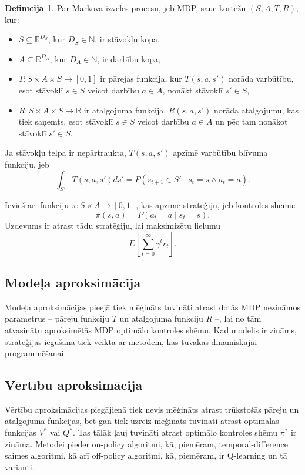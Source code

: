 \documentclass[a0,landscape]{a0poster}
\numberwithin{equation}{section}
\theoremstyle{definition}
\newtheorem{definicija}{Defin\={\i}cija}%
\theoremstyle{plain}
\begin{document}
\begin{multicols}{4}
\begin{definicija}
Par Markova izvēles procesu, jeb MDP, sauc kortežu $(S, A, T, R)$, kur:
\begin{itemize}
	\item $S \subseteq \mathbb{R}^{D_S}$, kur $D_S \in \mathbb{N}$, ir stāvokļu kopa, %
	\item $A \subseteq \mathbb{R}^{D_A}$, kur $D_A \in \mathbb{N}$, ir darbību kopa, %
	\item $T:S \times A \times S \rightarrow [0,1]$ ir pārejas funkcija, kur $T(s, a, s')$ norāda varbūtību, esot stāvoklī $s \in S$ veicot darbību $a \in A$, nonākt stāvoklī $s' \in S$,
	\item $R:S \times A \times S \rightarrow \mathbb{R}$ ir atalgojuma funkcija, $R(s, a, s')$ norāda atalgojumu, kas tiek saņemts, esot stāvoklī $s \in S$ veicot darbību $a \in A$ un pēc tam nonākot stāvoklī $s' \in S$.
\end{itemize}
Ja stāvokļu telpa ir nepārtraukta, $T(s, a, s')$ apzīmē varbūtību blīvuma funkciju, jeb
\[
	\int_{S'} T(s, a, s')ds' = P(s_{t+1} \in S' \mid s_t = s \land a_t = a).
\]
\end{definicija}

Ievieš arī funkciju $\pi: S \times A \rightarrow [0, 1]$, kas apzīmē stratēģiju, jeb kontroles shēmu:
\[
	\pi(s, a) = P(a_t = a \mid s_t = s).
\]
Uzdevums ir atrast tādu stratēģiju, lai maksimizētu lielumu
\[
	E\left[\sum_{t=0}^{\infty}\gamma^t r_t\right].
\]

\subsection*{Modeļa aproksimācija}
Modeļa aproksimācijas pieejā tiek mēģināts tuvināti atrast dotās MDP nezināmos parametrus -- pāreju funkciju $T$ un atalgojuma funkciju $R$ --, lai no tām atvasinātu aproksimētās MDP optimālo kontroles shēmu.
Kad modelis ir zināms, stratēģijas iegūšana tiek veikta ar metodēm, kas tuvākas dinamiskajai programmēšanai.

\subsection*{Vērtību aproksimācija}
Vērtību aproksimācijas piegājienā tiek nevis mēģināts atrast trūkstošās pāreju un atalgojuma funkcijas, bet gan tiek uzreiz mēģināts tuvināti atrast optimālās funkcijas $V^*$ vai $Q^*$.
Tas tālāk ļauj tuvināti atrast optimālo kontroles shēmu $\pi^*$ ir zināma.
Metodei pieder on-policy algoritmi, kā, piemēram, temporal-difference saimes algoritmi, kā arī off-policy algoritmi, kā, piemēram, ir Q-learning un tā varianti.


\end{multicols}
\end{document}
